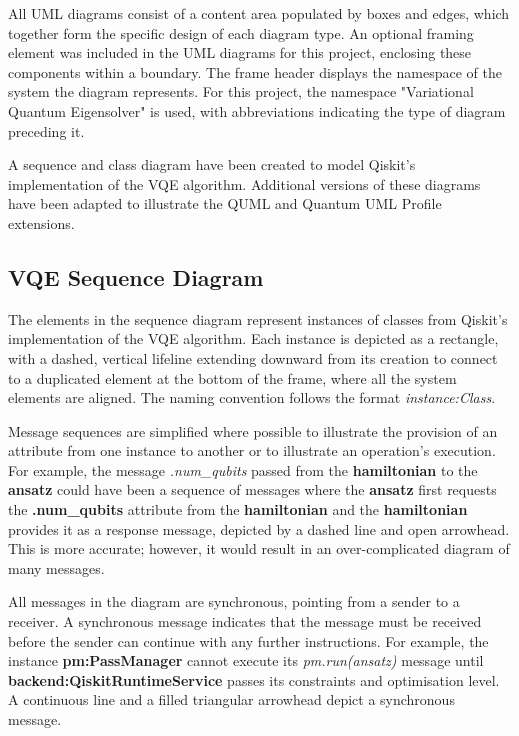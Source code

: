 \documentclass{article}
\begin{document}
{All UML diagrams consist of a content area populated by boxes and edges, which together form the specific design of each diagram type. An optional framing element was included in the UML diagrams for this project, enclosing these components within a boundary. The frame header displays the namespace of the system the diagram represents\cite{UMLElementFrame}. For this project, the namespace "Variational Quantum Eigensolver" is used, with abbreviations indicating the type of diagram preceding it. 

A sequence and class diagram have been created to model Qiskit’s implementation of the VQE algorithm. Additional versions of these diagrams have been adapted to illustrate the QUML and Quantum UML Profile extensions.

\subsection{VQE Sequence Diagram}

The elements in the sequence diagram represent instances of classes from Qiskit’s implementation of the VQE algorithm. Each instance is depicted as a rectangle, with a dashed, vertical lifeline extending downward from its creation to connect to a duplicated element at the bottom of the frame, where all the system elements are aligned. The naming convention follows the format \textit{instance:Class}.

Message sequences are simplified where possible to illustrate the provision of an attribute from one instance to another or to illustrate an operation's execution. For example, the message \textit{.num\_qubits} passed from the \textbf{hamiltonian} to the \textbf{ansatz} could have been a sequence of messages where the \textbf{ansatz} first requests the \textbf{.num\_qubits} attribute from the \textbf{hamiltonian} and the \textbf{hamiltonian} provides it as a response message, depicted by a dashed line and open arrowhead. This is more accurate; however, it would result in an over-complicated diagram of many messages. 

All messages in the diagram are synchronous, pointing from a sender to a receiver. A synchronous message indicates that the message must be received before the sender can continue with any further instructions\cite{Seidl_Scholz_Huemer_Kappel_Duffy_2014}. For example, the instance \textbf{pm:PassManager} cannot execute its \textit{pm.run(ansatz)} message until \textbf{backend:QiskitRuntimeService} passes its constraints and optimisation level. A continuous line and a filled triangular arrowhead depict a synchronous message.

}
\end{document}
